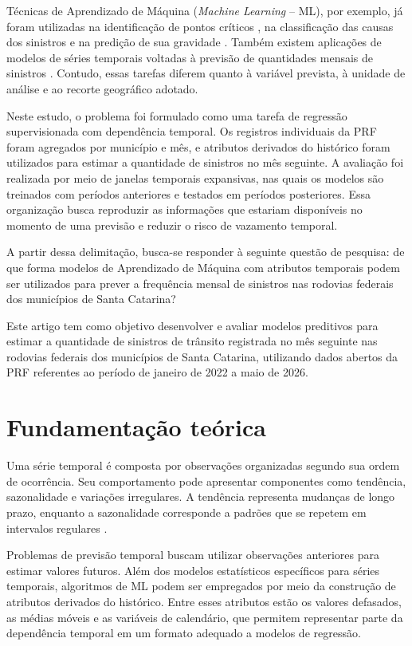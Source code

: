 \documentclass[12pt]{article}
\begin{document}
Técnicas de Aprendizado de Máquina (\textit{Machine Learning} -- ML), por exemplo, já foram utilizadas na identificação de pontos críticos \cite{santos2021machine}, na classificação das causas dos sinistros \cite{silva2024classificacao} e na predição de sua gravidade \cite{mafort2025tecnicas}. Também existem aplicações de modelos de séries temporais voltadas à previsão de quantidades mensais de sinistros \cite{getahun2021timeseries}. Contudo, essas tarefas diferem quanto à variável prevista, à unidade de análise e ao recorte geográfico adotado.

Neste estudo, o problema foi formulado como uma tarefa de regressão supervisionada com dependência temporal. Os registros individuais da PRF foram agregados por município e mês, e atributos derivados do histórico foram utilizados para estimar a quantidade de sinistros no mês seguinte. A avaliação foi realizada por meio de janelas temporais expansivas, nas quais os modelos são treinados com períodos anteriores e testados em períodos posteriores. Essa organização busca reproduzir as informações que estariam disponíveis no momento de uma previsão e reduzir o risco de vazamento temporal.

A partir dessa delimitação, busca-se responder à seguinte questão de pesquisa: de que forma modelos de Aprendizado de Máquina com atributos temporais podem ser utilizados para prever a frequência mensal de sinistros nas rodovias federais dos municípios de Santa Catarina?

Este artigo tem como objetivo desenvolver e avaliar modelos preditivos para estimar a quantidade de sinistros de trânsito registrada no mês seguinte nas rodovias federais dos municípios de Santa Catarina, utilizando dados abertos da PRF referentes ao período de janeiro de 2022 a maio de 2026.


\section{Fundamentação teórica}

Uma série temporal é composta por observações organizadas segundo sua ordem de ocorrência. Seu comportamento pode apresentar componentes como tendência, sazonalidade e variações irregulares. A tendência representa mudanças de longo prazo, enquanto a sazonalidade corresponde a padrões que se repetem em intervalos regulares \cite{hyndman2021forecasting}.

Problemas de previsão temporal buscam utilizar observações anteriores para estimar valores futuros. Além dos modelos estatísticos específicos para séries temporais, algoritmos de ML podem ser empregados por meio da construção de atributos derivados do histórico. Entre esses atributos estão os valores defasados, as médias móveis e as variáveis de calendário, que permitem representar parte da dependência temporal em um formato adequado a modelos de regressão.
\end{document}
